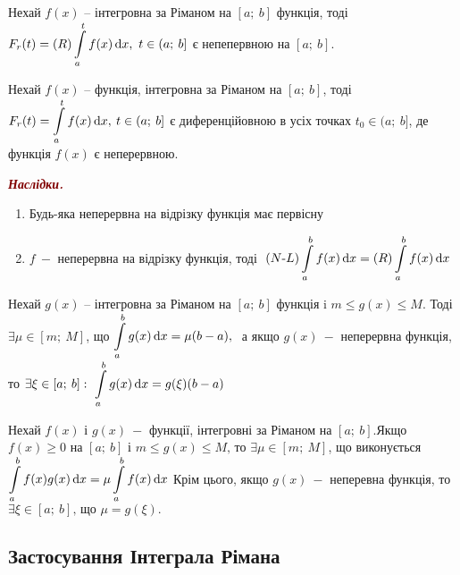 \begin{theorem}
    Нехай $f(x) $ -- інтегровна за Ріманом на $[a;\:b]$ функція, тоді $F_r(t)=(R)\displaystyle\int\limits_{a}^{t}f(x)\,\mathrm{d} x, \ t \in (a;\:b]$ є непепервною на $[a;\:b]$.
\end{theorem}


\begin{theorem}
    Нехай $f(x)$ -- функція, інтегровна за Ріманом на  $[a;\:b]$, тоді $ F_r(t)=\displaystyle\int\limits_{a}^{t}f(x)\,\mathrm{d} x,\: t \in (a;\:b]$ є диференційовною в усіх точках $t_0 \in (a;\:b]$, де функція $f(x)$ є неперервною.
\end{theorem}


\textcolor{Maroon}{\textbf{\textit{{Наслідки.}}}}
\begin{enumerate}
    \item Будь-яка неперервна на відрізку функція має первісну
    \item $f \:-$ неперервна на відрізку функція, тоді $\ (N\text{-}L)\Int_{a}^{b}f(x)\,\mathrm{d} x = (R)\Int_{a}^{b}f(x)\,\mathrm{d} x$
\end{enumerate}


\begin{theorem}
    Нехай $g(x) $ -- інтегровна за Ріманом на $[a;\:b]$ функція i $ m \leqslant g(x) \leqslant M $. Тоді $\exists \mu \in [m;\:M]$, що $\Int_a^b g(x)\,\mathrm{d} x = \mu(b-a),\ $  а якщо $g(x)\:- $  неперервна функція, то $\exists \xi \in [a;\:b]: \ \displaystyle\int\limits_a^b g(x)\,\mathrm{d} x=g(\xi )(b-a)$
\end{theorem}


\begin{theorem}
    Нехай $f(x)$ і $g(x)\: -$ функції, інтегровні за Ріманом на  $[a;\:b]$.\newline Якщо $f(x)\geqslant 0$ на $[a;\:b]$ і $ m\leqslant g(x)\leqslant M \text{, то } \exists \mu \in [m;\:M]$, що виконується
    $\displaystyle\int\limits_a^b f(x)g(x)\,\mathrm{d} x= \mu \displaystyle\int\limits_a^b f(x)\,\mathrm{d} x$
    \newline Крім цього, якщо $g(x)\: - $  неперевна функція, то $\exists \xi \in [a;\:b] \text{, що } \mu=g(\xi).$
\end{theorem}


\subsection{\large{Застосування Інтеграла Рімана}}



